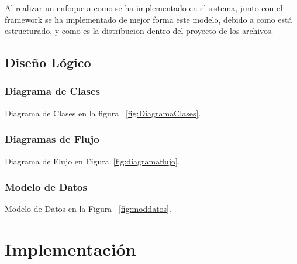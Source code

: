 \documentclass[12pt]{article}
\begin{document}
Al realizar un enfoque a como se ha implementado en el sistema, junto con el framework se ha implementado de mejor 
forma este modelo, debido a como está estructurado, y como es la distribucion dentro del proyecto de los archivos.

\subsection{Dise\~no Lógico}
\subsubsection{Diagrama de Clases}
Diagrama de Clases en la figura ~\ref{fig:DiagramaClases}.

\subsubsection{Diagramas de Flujo}
Diagrama de Flujo en Figura~\ref{fig:diagramaflujo}.

\subsubsection{Modelo de Datos}
Modelo de Datos en la Figura ~\ref{fig:moddatos}.



\newpage
\section{Implementación}
\end{document}
